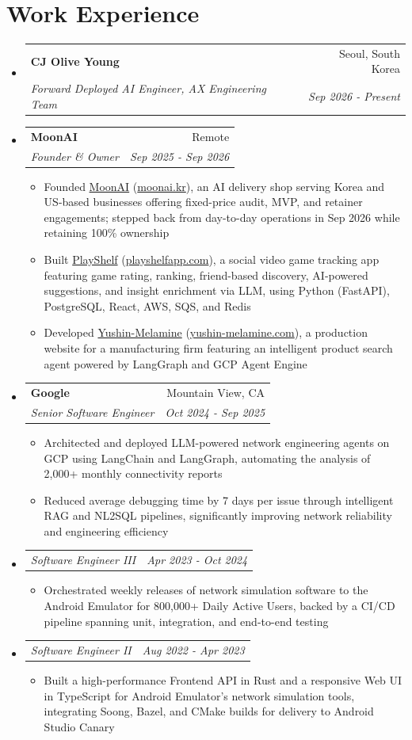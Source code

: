 \documentclass[10pt]{article}
\makeatletter
\newcommand{\resumeItem}[1]{\item\small{#1}}
\newcommand{\resumeSubheading}[4]{
  \vspace{-2pt}\item[]
    \begin{tabular*}{\linewidth}[t]{l@{\extracolsep{\fill}}r}
      \textbf{#1} & #2 \\
      \textit{\small#3} & \textit{\small #4} \\
    \end{tabular*}\vspace{-5pt}
}
\newcommand{\resumePosition}[2]{
  \vspace{-2pt}\item[]
    \begin{tabular*}{\linewidth}[t]{l@{\extracolsep{\fill}}r}
      \textit{\small#1} & \textit{\small #2} \\
    \end{tabular*}\vspace{-5pt}
}
\makeatother
\begin{document}
\section{Work Experience}
\begin{itemize}[leftmargin=0.15in, label={}, itemsep=0pt]
    \resumeSubheading
        {CJ Olive Young}{Seoul, South Korea}
        {Forward Deployed AI Engineer, AX Engineering Team}{Sep 2026 - Present}
        \vspace{8pt}

    \resumeSubheading
        {MoonAI}{Remote}
        {Founder \& Owner}{Sep 2025 - Sep 2026}
        \begin{itemize}[leftmargin=0.2in, itemsep=0pt]
            \resumeItem{Founded \href{https://moonai.kr}{MoonAI} (\href{https://moonai.kr}{moonai.kr}), an AI delivery shop serving Korea and US-based businesses offering fixed-price audit, MVP, and retainer engagements; stepped back from day-to-day operations in Sep 2026 while retaining 100\% ownership}
            \resumeItem{Built \href{https://playshelfapp.com}{PlayShelf} (\href{https://playshelfapp.com}{playshelfapp.com}), a social video game tracking app featuring game rating, ranking, friend-based discovery, AI-powered suggestions, and insight enrichment via LLM, using Python (FastAPI), PostgreSQL, React, AWS, SQS, and Redis}
            \resumeItem{Developed \href{https://yushin-melamine.com}{Yushin-Melamine} (\href{https://yushin-melamine.com}{yushin-melamine.com}), a production website for a manufacturing firm featuring an intelligent product search agent powered by LangGraph and GCP Agent Engine}
        \end{itemize}

    \resumeSubheading
        {Google}{Mountain View, CA}
        {Senior Software Engineer}{Oct 2024 - Sep 2025}
        \begin{itemize}[leftmargin=0.2in, itemsep=0pt]
            \resumeItem{Architected and deployed LLM-powered network engineering agents on GCP using LangChain and LangGraph, automating the analysis of 2,000+ monthly connectivity reports}
            \resumeItem{Reduced average debugging time by 7 days per issue through intelligent RAG and NL2SQL pipelines, significantly improving network reliability and engineering efficiency}
        \end{itemize}
        \resumePosition{Software Engineer III}{Apr 2023 - Oct 2024}
        \begin{itemize}[leftmargin=0.2in, itemsep=0pt]
            \resumeItem{Orchestrated weekly releases of network simulation software to the Android Emulator for 800,000+ Daily Active Users, backed by a CI/CD pipeline spanning unit, integration, and end-to-end testing}
        \end{itemize}
        \resumePosition{Software Engineer II}{Aug 2022 - Apr 2023}
        \begin{itemize}[leftmargin=0.2in, itemsep=0pt]
            \resumeItem{Built a high-performance Frontend API in Rust and a responsive Web UI in TypeScript for Android Emulator's network simulation tools, integrating Soong, Bazel, and CMake builds for delivery to Android Studio Canary}
        \end{itemize}


\end{itemize}
\end{document}
